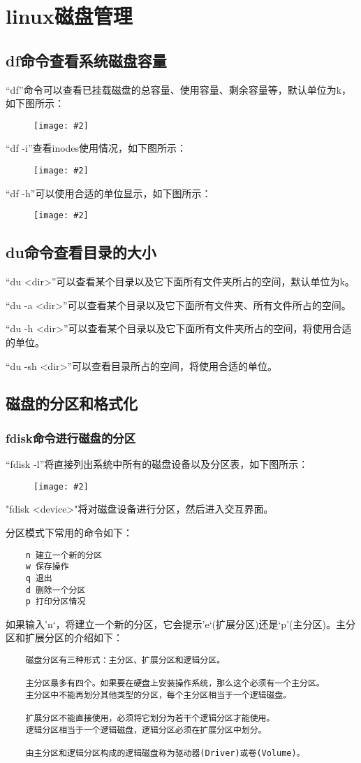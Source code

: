 \documentclass[a4paper,left=2.5cm,right=2.5cm,11pt]{article}
\newcommand{\sizedfic}[2]{\begin{figure}[H]
		\center
		\texttt{[image: \#2]}
	\end{figure}}
\begin{document}
\tableofcontents

\clearpage

\section{linux磁盘管理}
\subsection{df命令查看系统磁盘容量}
	“df”命令可以查看已挂载磁盘的总容量、使用容量、剩余容量等，默认单位为k，如下图所示：
	\sizedfic{0.5}{1.png}

	“df -i”查看inodes使用情况，如下图所示：
	\sizedfic{0.5}{2.png}

	“df -h”可以使用合适的单位显示，如下图所示：
	\sizedfic{0.5}{3.png}

\subsection{du命令查看目录的大小}
	“du <dir>”可以查看某个目录以及它下面所有文件夹所占的空间，默认单位为k。\par

	“du -a <dir>”可以查看某个目录以及它下面所有文件夹、所有文件所占的空间。\par

	“du -h <dir>”可以查看某个目录以及它下面所有文件夹所占的空间，将使用合适的单位。\par

	“du -sh <dir>”可以查看目录所占的空间，将使用合适的单位。

\subsection{磁盘的分区和格式化}
\subsubsection{fdisk命令进行磁盘的分区}
	“fdisk -l”将直接列出系统中所有的磁盘设备以及分区表，如下图所示：
	\sizedfic{0.45}{4.png}

	"fdisk <device>"将对磁盘设备进行分区，然后进入交互界面。\par

	分区模式下常用的命令如下：
	\begin{lstlisting}
	n 建立一个新的分区
	w 保存操作
	q 退出
	d 删除一个分区
	p 打印分区情况
	\end{lstlisting}

	如果输入’n‘，将建立一个新的分区，它会提示’e‘(扩展分区)还是‘p’(主分区)。主分区和扩展分区的介绍如下：
	\begin{lstlisting}
	磁盘分区有三种形式：主分区、扩展分区和逻辑分区。

	主分区最多有四个。如果要在硬盘上安装操作系统，那么这个必须有一个主分区。
	主分区中不能再划分其他类型的分区，每个主分区相当于一个逻辑磁盘。

	扩展分区不能直接使用，必须将它划分为若干个逻辑分区才能使用。
	逻辑分区相当于一个逻辑磁盘，逻辑分区必须在扩展分区中划分。

	由主分区和逻辑分区构成的逻辑磁盘称为驱动器(Driver)或卷(Volume)。
	\end{lstlisting}
\end{document}
